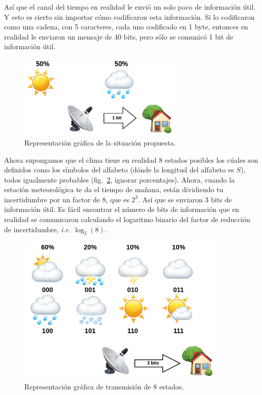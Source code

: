 \documentclass[a4paper,12pt]{article}
\begin{document}
Así que el canal del tiempo en realidad le envió un solo poco de información útil. Y esto es cierto sin importar cómo codificaron esta información. Si lo codificaron como una cadena, con 5 caracteres, cada uno codificado en 1 byte, entonces en realidad le enviaron un mensaje de 40 bits, pero sólo se comunicó 1 bit de información útil.

\begin{figure}[H]
	\begin{center}
	\includegraphics[width=0.7\textwidth]{geron_1.png}
  	\caption{Representación gráfica de la situación propuesta.}
  	\label{fig:geron1}
  	\end{center}
\end{figure}

Ahora supongamos que el clima tiene en realidad 8 estados posibles los cúales son definidos como los símbolos del alfabeto (dónde la longitud del alfabeto es $S$), todos igualmente probables (fig.~\ref{fig:geron2}, ignorar porcentajes). Ahora, cuando la estación meteorológica te da el tiempo de mañana, están dividiendo tu incertidumbre por un factor de 8, que es $2^3$. Así que se enviaron 3 bits de información útil. Es fácil encontrar el número de bits de información que en realidad se comunicaron calculando el logaritmo binario del factor de reducción de incertidumbre, \textit{i.e.} $\log_2(8)$.

\begin{figure}[H]
	\begin{center}
	\includegraphics[width=0.9\textwidth]{geron_2.png}
  	\caption{Representación gráfica de transmisión de 8 estados.}
  	\label{fig:geron2}
  	\end{center}
\end{figure}
\end{document}
